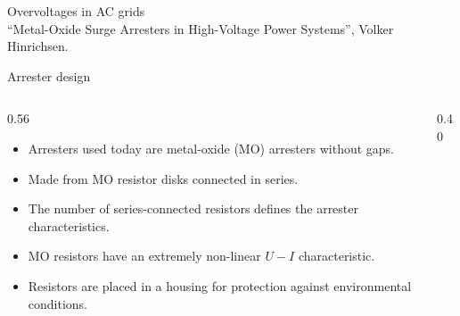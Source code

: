 
\begin{frame}{Overvoltages in AC grids}
  \centering
  \\[0.3em]
  {\color{atGray}\footnotesize ``Metal-Oxide Surge Arresters in High-Voltage
  Power Systems'', Volker Hinrichsen.}
\end{frame}

\begin{frame}{Arrester design}
  \begin{columns}[c,onlytextwidth]
    \begin{column}{0.56\textwidth}
      \begin{itemize}
        \setlength{\itemsep}{0.4em}
        \item Arresters used today are metal-oxide (MO) arresters without gaps.
        \item Made from MO resistor disks connected in series.
        \item The number of series-connected resistors defines the arrester
              characteristics.
        \item MO resistors have an extremely non-linear $U-I$ characteristic.
        \item Resistors are placed in a housing for protection against
              environmental conditions.
      \end{itemize}
    \end{column}
    \begin{column}{0.40\textwidth}
      \centering
    \end{column}
  \end{columns}
\end{frame}

